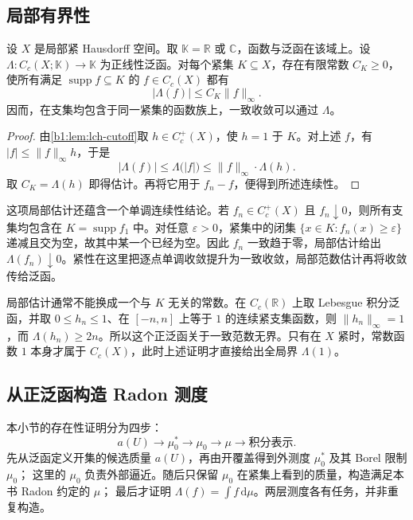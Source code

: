 \subsection{局部有界性}
\label{b1:subsec:110302}

\begin{lemma}\label{b1:lem:positive-functional-local-bound}
设 \(X\) 是局部紧 Hausdorff 空间。取 \(\mathbb K=\mathbb R\) 或 \(\mathbb C\)，函数与泛函在该域上。设 \(\Lambda:C_c(X;\mathbb K)\to\mathbb K\) 为正线性泛函。对每个紧集 \(K\subseteq X\)，存在有限常数 \(C_K\geq0\)，使所有满足 \(\operatorname{supp}f\subseteq K\) 的 \(f\in C_c(X)\) 都有
\[
 \bigl|\Lambda(f)\bigr|\leq C_K\|f\|_\infty.
\]
因而，在支集均包含于同一紧集的函数族上，一致收敛可以通过 \(\Lambda\)。
\end{lemma}
\begin{proof}
由\cref{b1:lem:lch-cutoff}取 \(h\in C_c^+(X)\)，使 \(h=1\) 于 \(K\)。对上述 \(f\)，有 \(|f|\leq\|f\|_\infty h\)，于是
\[
 \bigl|\Lambda(f)\bigr|
 \leq\Lambda\bigl(|f|\bigr)
 \leq\|f\|_\infty\cdot \Lambda(h).
\]
取 \(C_K=\Lambda(h)\) 即得估计。再将它用于 \(f_n-f\)，便得到所述连续性。
\end{proof}

这项局部估计还蕴含一个单调连续性结论。若 \(f_n\in C_c^+(X)\) 且 \(f_n\downarrow0\)，则所有支集均包含在 \(K=\operatorname{supp}f_1\) 中。对任意 \(\varepsilon>0\)，紧集中的闭集 \(\{x\in K:f_n(x)\geq\varepsilon\}\) 递减且交为空，故其中某一个已经为空。因此 \(f_n\) 一致趋于零，局部估计给出 \(\Lambda(f_n)\downarrow0\)。紧性在这里把逐点单调收敛提升为一致收敛，局部范数估计再将收敛传给泛函。

\ProseParagraphBreak

局部估计通常不能换成一个与 \(K\) 无关的常数。在 \(C_c(\mathbb R)\) 上取 Lebesgue 积分泛函，并取 \(0\leq h_n\leq1\)、在 \([-n,n]\) 上等于 \(1\) 的连续紧支集函数，则 \(\|h_n\|_\infty=1\)，而 \(\Lambda(h_n)\geq2n\)。所以这个正泛函关于一致范数无界。只有在 \(X\) 紧时，常数函数 \(1\) 本身才属于 \(C_c(X)\)，此时上述证明才直接给出全局界 \(\Lambda(1)\)。

\subsection{从正泛函构造 Radon 测度}
\label{b1:subsec:110303}

本小节的存在性证明分为四步：
\[
 a(U)\longrightarrow\mu_0^*\longrightarrow\mu_0
 \longrightarrow\mu\longrightarrow\text{积分表示}.
\]
先从泛函定义开集的候选质量 \(a(U)\)，再由开覆盖得到外测度 \(\mu_0^*\) 及其 Borel 限制 \(\mu_0\)；
这里的 \(\mu_0\) 负责外部逼近。随后只保留 \(\mu_0\) 在紧集上看到的质量，构造满足本书 Radon 约定的 \(\mu\)；
最后才证明 \(\Lambda(f)=\int f\,\mathrm d\mu\)。两层测度各有任务，并非重复构造。

